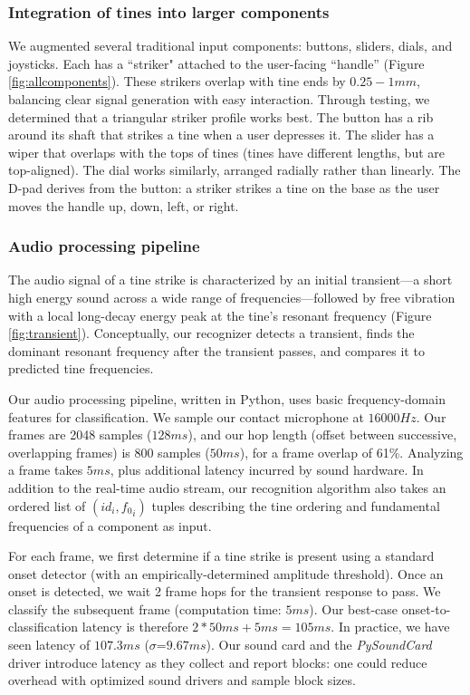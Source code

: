 \subsubsection{Integration of tines into larger components}

We augmented several traditional input components: buttons, sliders, dials, and joysticks. Each has a ``striker" attached to the user-facing ``handle'' (Figure \ref{fig:allcomponents}).  These strikers overlap with tine ends by $0.25-1mm$, balancing clear signal generation with easy interaction. Through testing, we determined that a triangular striker profile works best.
The button has a rib around its shaft that strikes a tine when a user depresses it.  The slider has a wiper that overlaps with the tops of tines (tines have different lengths, but are top-aligned).  The dial works similarly, arranged radially rather than linearly.  The D-pad derives from the button: a striker strikes a tine on the base as the user moves the handle up, down, left, or right.

\subsubsection{Audio processing pipeline}
The audio signal of a tine strike is characterized by an initial transient---a short high energy sound across a wide range of frequencies---followed by free vibration with a local long-decay energy peak at the tine's resonant frequency (Figure \ref{fig:transient}). Conceptually, our recognizer detects a transient, finds the dominant resonant frequency after the transient passes, and compares it to predicted tine frequencies.

Our audio processing pipeline, written in Python, uses basic frequency-domain features for classification. We sample our contact microphone at $16000Hz$.  Our frames are 2048 samples ($128ms$), and our hop length (offset between successive, overlapping frames) is 800 samples ($50ms$), for a frame overlap of 61\%. Analyzing a frame takes $5ms$, plus additional latency incurred by sound hardware. In addition to the real-time audio stream, our recognition algorithm also takes an ordered list of $(id_i,{f_0}_i)$ tuples describing the tine ordering and fundamental frequencies of a component as input.

For each frame, we first determine if a tine strike is present using a standard onset detector (with an empirically-determined amplitude threshold). Once an onset is detected, we wait 2 frame hops for the transient response to pass.
We classify the subsequent frame (computation time: $5ms$).  Our best-case onset-to-classification latency is therefore $2 * 50ms + 5ms = 105ms$.   In practice, we have seen latency of $107.3ms$ ($\sigma$=$9.67ms$).  
Our sound card and the \emph{PySoundCard}
driver introduce latency as they collect and report blocks: one could reduce overhead with optimized sound drivers and sample block sizes.


